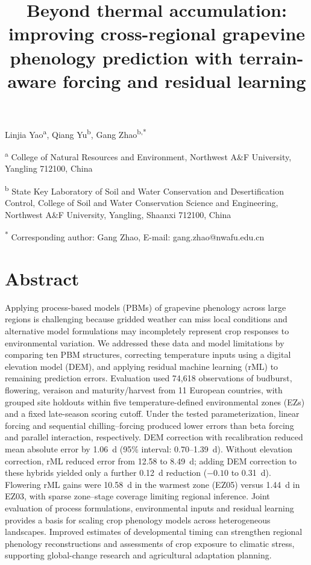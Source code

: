 \documentclass[a4paper,12pt]{article}
\renewenvironment{abstract}
  {\section*{Abstract}\noindent\ignorespaces}
  {\par\medskip}
\let\OriginalSection\section
\renewcommand{\section}{\FloatBarrier\OriginalSection}
\begin{document}
\title{\fontsize{16pt}{19.2pt}\selectfont\textbf{Beyond thermal accumulation: improving cross-regional grapevine phenology prediction with terrain-aware forcing and residual learning}}

\author{}
\date{}

\maketitle
\vspace{-2.0\baselineskip}

\begingroup
\setlength{\parindent}{0pt}
\setlength{\parskip}{0.35\baselineskip}
Linjia Yao\textsuperscript{a}, Qiang Yu\textsuperscript{b}, Gang Zhao\textsuperscript{b,*}

\textsuperscript{a} College of Natural Resources and Environment, Northwest A\&F University, Yangling 712100, China

\textsuperscript{b} State Key Laboratory of Soil and Water Conservation and Desertification Control, College of Soil and Water Conservation Science and Engineering, Northwest A\&F University, Yangling, Shaanxi 712100, China

\textsuperscript{*} Corresponding author: Gang Zhao, E-mail: gang.zhao@nwafu.edu.cn
\par
\endgroup

\linenumbers
\justifying
\setlength{\parindent}{0pt}

\begin{abstract}
Applying process-based models (PBMs) of grapevine phenology across large regions is challenging because gridded weather can miss local conditions and alternative model formulations may incompletely represent crop responses to environmental variation. We addressed these data and model limitations by comparing ten PBM structures, correcting temperature inputs using a digital elevation model (DEM), and applying residual machine learning (rML) to remaining prediction errors. Evaluation used 74,618 observations of budburst, flowering, veraison and maturity/harvest from 11 European countries, with grouped site holdouts within five temperature-defined environmental zones (EZs) and a fixed late-season scoring cutoff. Under the tested parameterization, linear forcing and sequential chilling--forcing produced lower errors than beta forcing and parallel interaction, respectively. DEM correction with recalibration reduced mean absolute error by 1.06~d (95\% interval: 0.70--1.39~d). Without elevation correction, rML reduced error from 12.58 to 8.49~d; adding DEM correction to these hybrids yielded only a further 0.12~d reduction ($-0.10$ to 0.31~d). Flowering rML gains were 10.58~d in the warmest zone (EZ05) versus 1.44~d in EZ03, with sparse zone--stage coverage limiting regional inference. Joint evaluation of process formulations, environmental inputs and residual learning provides a basis for scaling crop phenology models across heterogeneous landscapes. Improved estimates of developmental timing can strengthen regional phenology reconstructions and assessments of crop exposure to climatic stress, supporting global-change research and agricultural adaptation planning.
\end{abstract}
\end{document}
